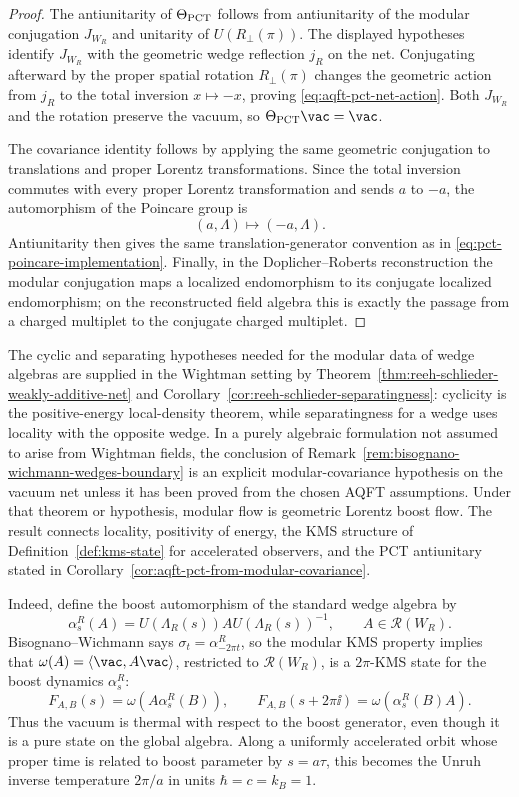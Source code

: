 \begin{proof}
The antiunitarity of \(\Theta_{\rm PCT}\) follows from antiunitarity of the
modular conjugation \(J_{W_R}\) and unitarity of \(U(R_\perp(\pi))\).  The
displayed hypotheses identify \(J_{W_R}\) with the geometric wedge reflection
\(j_R\) on the net.  Conjugating afterward by the proper spatial
rotation \(R_\perp(\pi)\) changes the geometric action from \(j_R\) to the
total inversion \(x\mapsto -x\), proving
\eqref{eq:aqft-pct-net-action}.  Both \(J_{W_R}\) and the rotation preserve
the vacuum, so \(\Theta_{\rm PCT}\vac=\vac\).

The covariance identity follows by applying the same geometric conjugation to
translations and proper Lorentz transformations.  Since the total inversion
commutes with every proper Lorentz transformation and sends \(a\) to \(-a\),
the automorphism of the Poincare group is
\[
  (a,\Lambda)\longmapsto(-a,\Lambda).
\]
Antiunitarity then gives the same translation-generator convention as in
\eqref{eq:pct-poincare-implementation}.  Finally, in the
Doplicher--Roberts reconstruction the modular conjugation maps a localized
endomorphism to its conjugate localized endomorphism; on the reconstructed
field algebra this is exactly the passage from a charged multiplet to the
conjugate charged multiplet.
\end{proof}

The cyclic and separating hypotheses needed for the modular data of wedge
algebras are supplied in the Wightman setting by
Theorem~\ref{thm:reeh-schlieder-weakly-additive-net} and
Corollary~\ref{cor:reeh-schlieder-separatingness}: cyclicity is the
positive-energy local-density theorem, while separatingness for a wedge uses
locality with the opposite wedge.  In a purely algebraic formulation not
assumed to arise from Wightman fields, the conclusion of
Remark~\ref{rem:bisognano-wichmann-wedges-boundary} is an explicit
modular-covariance hypothesis on the vacuum net unless it has been proved from
the chosen AQFT assumptions.  Under that theorem or hypothesis, modular flow
is geometric Lorentz boost flow.  The result connects locality, positivity of
energy, the KMS structure of Definition~\ref{def:kms-state} for accelerated
observers, and the PCT antiunitary stated in
Corollary~\ref{cor:aqft-pct-from-modular-covariance}.

Indeed, define the boost automorphism of the standard wedge algebra by
\[
  \alpha_s^R(A)=
  U(\Lambda_R(s))AU(\Lambda_R(s))^{-1},
  \qquad A\in\mathcal R(W_R).
\]
Bisognano--Wichmann says \(\sigma_t=\alpha_{-2\pi t}^R\), so the modular KMS
property implies that \(\omega(A)=\langle\vac,A\vac\rangle\), restricted to
\(\mathcal R(W_R)\), is a \(2\pi\)-KMS state for the boost dynamics
\(\alpha_s^R\):
\[
  F_{A,B}(s)=\omega(A\alpha_s^R(B)),
  \qquad
  F_{A,B}(s+2\pi\ii)=\omega(\alpha_s^R(B)A).
\]
Thus the vacuum is thermal with respect to the boost generator, even though it
is a pure state on the global algebra.  Along a uniformly accelerated orbit
whose proper time is related to boost parameter by \(s=a\tau\), this becomes
the Unruh inverse temperature \(2\pi/a\) in units \(\hbar=c=k_B=1\).


